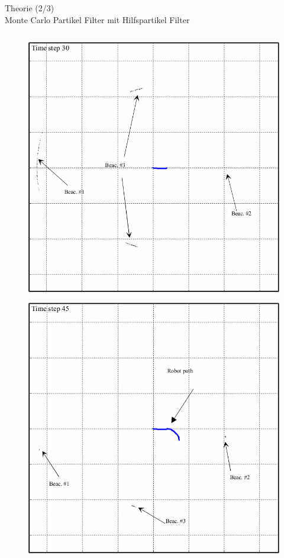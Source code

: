 \documentclass{beamer}
\begin{document}
\begin{frame}{Theorie (2/3)\\Monte Carlo Partikel Filter mit Hilfspartikel Filter}
\begin{columns}
\begin{overlayarea}{\textwidth}{.9\textheight}
{\begin{figure}
						\caption{\cite{blanco2008pure}}
					\end{figure}
				}
				{
					\begin{figure}
						\centering
						\includegraphics[width=\linewidth]{blanco2008pure_fig3g}
						\caption{\cite{blanco2008pure}}
					\end{figure}
				}
				{
					\begin{figure}
						\centering
						\includegraphics[width=\linewidth]{blanco2008pure_fig3h}

\end{figure}}
\end{overlayarea}
\end{columns}
\end{frame}
\end{document}
